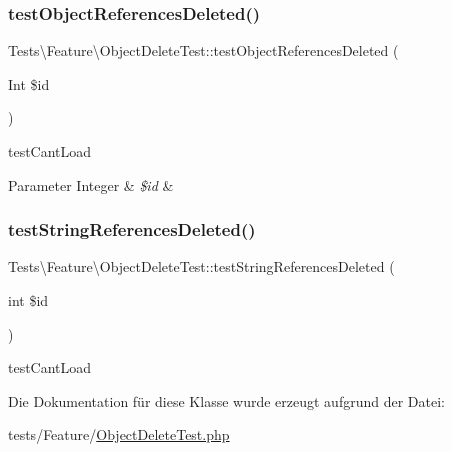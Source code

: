 \subsubsection{\texorpdfstring{test\+Object\+References\+Deleted()}{testObjectReferencesDeleted()}}
{\footnotesize\ttfamily Tests\textbackslash{}\+Feature\textbackslash{}\+Object\+Delete\+Test\+::test\+Object\+References\+Deleted (\begin{DoxyParamCaption}\item[{Int}]{\$id }\end{DoxyParamCaption})}

test\+Cant\+Load 
\begin{DoxyParams}[1]{Parameter}
Integer & {\em \$id} & \\
\hline
\end{DoxyParams}
\mbox{\label{classTests_1_1Feature_1_1ObjectDeleteTest_a9403dc67da9a583f90f2a1e38278cc24}} 
\subsubsection{\texorpdfstring{test\+String\+References\+Deleted()}{testStringReferencesDeleted()}}
{\footnotesize\ttfamily Tests\textbackslash{}\+Feature\textbackslash{}\+Object\+Delete\+Test\+::test\+String\+References\+Deleted (\begin{DoxyParamCaption}\item[{int}]{\$id }\end{DoxyParamCaption})}

test\+Cant\+Load 

Die Dokumentation für diese Klasse wurde erzeugt aufgrund der Datei\+:\begin{DoxyCompactItemize}
\item 
tests/\+Feature/\hyperlink{ObjectDeleteTest_8php}{Object\+Delete\+Test.\+php}\end{DoxyCompactItemize}
